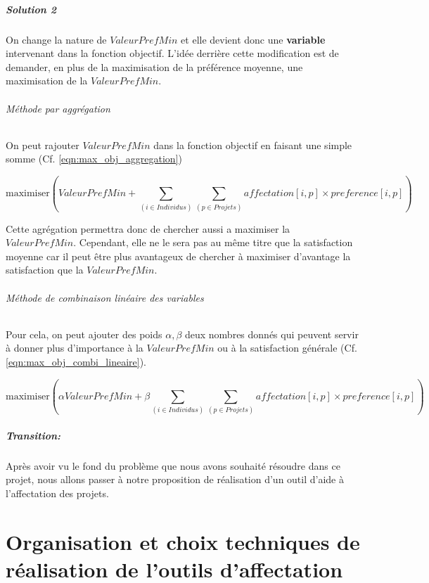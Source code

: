 \documentclass{polytech/polytech}
\begin{document}
\paragraph{Solution 2}
On change la nature de $ValeurPrefMin$ et elle devient donc une \textbf{variable} intervenant dans la fonction objectif.
L'idée derrière cette modification est de demander, en plus de la maximisation de la préférence moyenne, une maximisation de la $ValeurPrefMin$.

\subparagraph{Méthode par aggrégation}
On peut rajouter $ValeurPrefMin$ dans la fonction objectif en faisant une simple somme (Cf. \eqref{eqn:max_obj_aggregation})

\begin{equation}
\label{eqn:max_obj_aggregation}
\text{maximiser} \left( ValeurPrefMin + \sum_{(i \in Individus)} \sum_{(p\in Projets)} affectation[i,p]\times preference[i,p] \right)
\end{equation}

Cette agrégation permettra donc de chercher aussi a maximiser la $ValeurPrefMin$. Cependant, elle ne le sera pas au même titre que la satisfaction moyenne car il peut être plus avantageux de chercher à maximiser d'avantage la satisfaction que la $ValeurPrefMin$.

\subparagraph{Méthode de combinaison linéaire des variables}
Pour cela, on peut ajouter des poids $\alpha, \beta$ deux nombres donnés qui peuvent servir à donner plus d'importance à la $ValeurPrefMin$ ou à la satisfaction générale (Cf. \eqref{eqn:max_obj_combi_lineaire}).

\begin{equation}
\label{eqn:max_obj_combi_lineaire}
\text{maximiser} \left( \alpha ValeurPrefMin + \beta \sum_{(i \in Individus)} \sum_{(p\in Projets)} affectation[i,p]\times preference[i,p] \right)
\end{equation}


\paragraph{Transition:}
Après avoir vu le fond du problème que nous avons souhaité résoudre dans ce projet, nous allons passer à notre proposition de réalisation d'un outil d'aide à l'affectation des projets.


\chapter{Organisation et choix techniques de réalisation de l'outils d'affectation}
\end{document}
